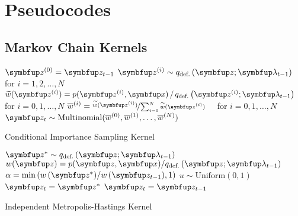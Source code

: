 
\section{Pseudocodes}
\subsection{Markov Chain Kernels}


  \begin{center}
\begin{minipage}[c]{0.63\textwidth}
  \begin{algorithm2e}[H]
    \DontPrintSemicolon
    \SetAlgoLined
    \(\vz^{(0)} = \vz_{t-1}\) \;
    \(\vz^{(i)} \sim q_{\text{def.}}\left(\vz;\vlambda_{t-1}\right)\quad\) for \(i = 1, 2,\ldots, N\) \;
    \(\widetilde{w}(\vz^{(i)}) = p(\vz^{(i)},\vx) \,/\, q_{\text{def.}}\left(\vz^{(i)}; \vlambda_{t-1}\right)\quad\) for \(i = 0, 1,\ldots, N\)\;
    \(\overline{w}^{(i)} = \nicefrac{\widetilde{w}(\vz^{(i)})}{ \sum^{N}_{i=0} \widetilde{w}(\vz^{(i)}) }\quad\) for \(i = 0, 1,\ldots, N\)\;
    \(\vz_{t} \sim \mathrm{Multinomial}(\overline{w}^{(0)}, \overline{w}^{(1)}, \ldots, \overline{w}^{(N)}) \)\;
    \caption{Conditional Importance Sampling Kernel}
  \end{algorithm2e}
\end{minipage}
  \end{center}

  \begin{center}
\begin{minipage}[c]{0.62\textwidth}
  \begin{algorithm2e}[H]
    \DontPrintSemicolon
    \SetAlgoLined
    \(\vz^* \sim q_{\text{def.}}\left(\vz; \vlambda_{t-1}\right)\)\;
    \(w(\vz) = p(\vz,\vx)/q_{\text{def.}}\left(\vz; \vlambda_{t-1}\right) \)\;
    \(\alpha = \min\left( w\,(\vz^*)/w\,(\vz_{t-1}), 1\right)\)\;
    \(u \sim \mathrm{Uniform}(0, 1) \)\;
        {
          \(\vz_t = \vz^*\)
        }
        {
          \(\vz_t = \vz_{t-1}\)
        }
        \caption{Independent Metropolis-Hastings Kernel}
  \end{algorithm2e}
\end{minipage}
  \end{center}

